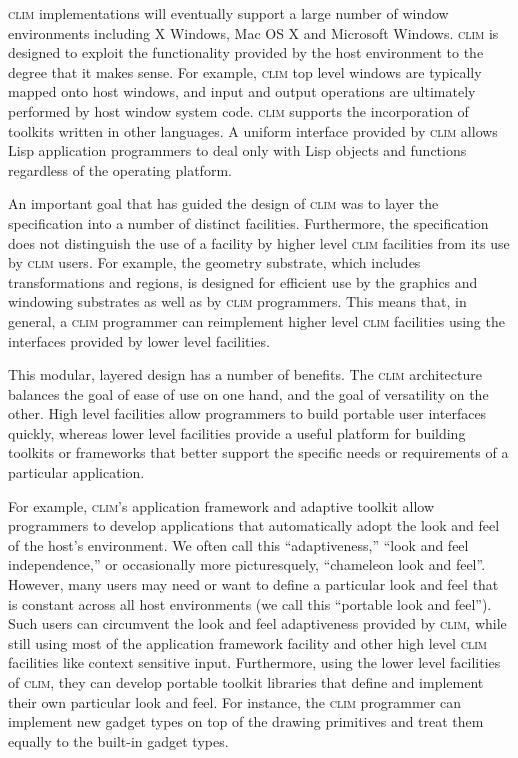 \documentclass[twocolumn,a4paper]{article}
\newcommand {\CLIM}{\textsc{clim}}
\begin{document}
\CLIM{} implementations will eventually support a large number of window environments
including X Windows, Mac OS X and Microsoft Windows. \CLIM{} is
designed to exploit the functionality provided by the host environment
to the degree that it makes sense. For example, \CLIM{} top level
windows are typically mapped onto host windows, and input and output
operations are ultimately performed by host window system
code. \CLIM{} supports the incorporation of
toolkits written in other languages. A uniform interface provided by
\CLIM{} allows Lisp application programmers to deal only with Lisp
objects and functions regardless of the operating platform.

An important goal that has guided the design of \CLIM{} was to
layer the specification into a number of distinct
facilities. Furthermore, the specification does not distinguish the
use of a facility by higher level \CLIM{} facilities from its use by
\CLIM{} users. For example, the geometry substrate, which includes
transformations and regions, is designed for efficient use by the
graphics and windowing substrates as well as by \CLIM{} programmers. This
means that, in general, a \CLIM{} programmer can reimplement higher level
\CLIM{} facilities using the interfaces provided by lower level
facilities.

This modular, layered design has a number of benefits. The \CLIM{}
architecture balances the goal of ease of use on one hand, and the
goal of versatility on the other. High level facilities allow
programmers to build portable user interfaces quickly, whereas lower
level facilities provide a useful platform for building toolkits or
frameworks that better support the specific needs or requirements of a
particular application.

For example, \CLIM{}'s application framework and adaptive toolkit
allow programmers to develop applications that automatically adopt the look
and feel of the host's environment. We often call this
``adaptiveness,'' ``look and feel independence,'' or occasionally more
picturesquely, ``chameleon look and feel''. However, many users may
need or want to define a particular look and feel that is constant
across all host environments (we call this ``portable look and
feel''). Such users can circumvent the look and feel adaptiveness
provided by \CLIM{}, while still using most of the application
framework facility and other high level \CLIM{} facilities like
context sensitive input. Furthermore, using the lower level facilities
of \CLIM{}, they can develop portable toolkit libraries that define
and implement their own particular look and feel. For instance, the
\CLIM{} programmer can implement new gadget types on top of the drawing
primitives and treat them equally to the built-in gadget types.
\end{document}
